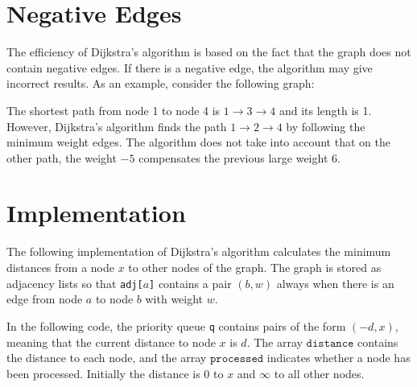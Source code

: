 \documentclass[twoside,12pt,a4paper,english]{book}
\theoremstyle{definition}
\theoremstyle{problemstyle}
\begin{document}
\centerline{}

\section{Negative Edges}

The efficiency of Dijkstra's algorithm is
based on the fact that the graph does not
contain negative edges.
If there is a negative edge,
the algorithm may give incorrect results.
As an example, consider the following graph:

\begin{center}
\end{center}
\noindent
The shortest path from node 1 to node 4 is
$1 \rightarrow 3 \rightarrow 4$
and its length is 1.
However, Dijkstra's algorithm
finds the path $1 \rightarrow 2 \rightarrow 4$
by following the minimum weight edges.
The algorithm does not take into account that
on the other path, the weight $-5$
compensates the previous large weight $6$.
\newpage

\section{Implementation}

The following implementation of Dijkstra's algorithm
calculates the minimum distances from a node $x$
to other nodes of the graph.
The graph is stored as adjacency lists
so that \texttt{adj[$a$]} contains a pair $(b,w)$
always when there is an edge from node $a$ to node $b$
with weight $w$.

In the following code, the priority queue
\texttt{q} contains pairs of the form $(-d,x)$,
meaning that the current distance to node $x$ is $d$.
The array $\texttt{distance}$ contains the distance to
each node, and the array $\texttt{processed}$ indicates
whether a node has been processed.
Initially the distance is $0$ to $x$ and $\infty$ to all other nodes.
\end{document}
